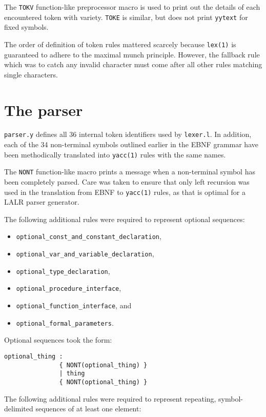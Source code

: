 \documentclass[a4paper,titlepage,12pt]{article}
\begin{document}
The \texttt{TOKV} function-like preprocessor macro is used to print out
the details of each encountered token with variety. \texttt{TOKE} is
similar, but does not print \texttt{yytext} for fixed symbols.

The order of definition of token rules mattered scarcely because
\texttt{lex(1)} is guaranteed to adhere to the maximal munch principle.
However, the fallback rule which was to catch any invalid character
must come after all other rules matching single characters.

\newpage

\section{The parser}

\texttt{parser.y} defines all 36 internal token identifiers used by
\texttt{lexer.l}. In addition, each of the 34 non-terminal symbols
outlined earlier in the EBNF grammar have been methodically translated
into \texttt{yacc(1)} rules with the same names.

The \texttt{NONT} function-like macro prints a message when a
non-terminal symbol has been completely parsed. Care was taken to
ensure that only left recursion was used in the translation from EBNF
to \texttt{yacc(1)} rules, as that is optimal for a LALR parser
generator.

The following additional rules were required to represent optional
sequences:

\begin{itemize}
	\item\texttt{optional\_const\_and\_constant\_declaration},
	\item\texttt{optional\_var\_and\_variable\_declaration},
	\item\texttt{optional\_type\_declaration},
	\item\texttt{optional\_procedure\_interface},
	\item\texttt{optional\_function\_interface}, and
	\item\texttt{optional\_formal\_parameters}.
\end{itemize}

Optional sequences took the form:

\begin{lstlisting}
optional_thing :
               { NONT(optional_thing) }
               | thing
               { NONT(optional_thing) }
\end{lstlisting}

The following additional rules were required to represent repeating,
symbol-delimited sequences of at least one element:
\end{document}

